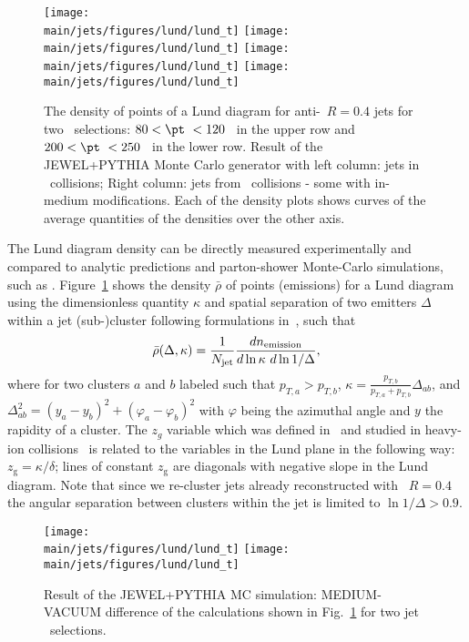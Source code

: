 \begin{figure}[htbp]
	\centering
	\texttt{[image: \\main/jets/figures/lund/lund\_t]}
	\texttt{[image: \\main/jets/figures/lund/lund\_t]}
	\texttt{[image: \\main/jets/figures/lund/lund\_t]}
	\texttt{[image: \\main/jets/figures/lund/lund\_t]}
	\caption{The density of points of a Lund diagram for anti-\kT\ $R=0.4$ jets for two \pt\ selections: $80 < \pt\ < 120$ \gevc\ in the upper row and $200 < \pt\ < 250$ \gevc\ in the lower row. Result of the JEWEL+PYTHIA Monte Carlo generator with left column: jets in \pp\ collisions; Right column: jets from \PbPb\ collisions - some with in-medium modifications. Each of the density plots shows curves of the average quantities of the densities over the other axis.}
	\label{fig:Lund_jets}
\end{figure}

The Lund diagram density can be directly measured experimentally and compared to analytic predictions and parton-shower Monte-Carlo simulations, such as \jewel.
Figure~\ref{fig:Lund_jets} shows the density $\bar{\rho}$ of points (emissions) for a Lund diagram using the dimensionless quantity $\kappa$ and spatial separation of two emitters $\Delta$ within a jet (sub-)cluster following formulations in~\cite{Dreyer:2018nbf}, such that
\begin{equation}
\bar{\rho}(\Delta, \kappa) = \frac{1}{N_{\rm jet}} \frac{dn_{\rm emission}}{d \ln \kappa~d \ln 1/\Delta},
\end{equation}
where for two clusters $a$ and $b$ labeled such that $p_{T,a} > p_{T,b}$, $\kappa=\frac{p_{T,b}}{p_{T,a} + p_{T,b}}\Delta_{ab}$, and $\Delta_{ab}^{2} = (y_a - y_b)^2 + (\varphi_a - \varphi_b)^2$ with $\varphi$ being the azimuthal angle and $y$ the rapidity of a cluster.
The $z_{g}$ variable which was defined in~\cite{Larkoski:2015lea} and studied in heavy-ion collisions~\cite{Sirunyan:2017bsd} is related to the variables in the Lund plane in the following way: $z_{\mathrm{g}} = \kappa/\delta$; lines of constant $z_\mathrm{g}$ are diagonals with negative slope in the Lund diagram. Note that since we re-cluster jets already reconstructed with \akt\ $R=0.4$ the angular separation between clusters within the jet is limited to $\ln 1/\Delta > 0.9$.

\begin{figure}[htbp]
	\centering
	\texttt{[image: \\main/jets/figures/lund/lund\_t]}
	\texttt{[image: \\main/jets/figures/lund/lund\_t]}
	\caption{Result of the JEWEL+PYTHIA MC simulation: MEDIUM-VACUUM difference of the calculations shown in Fig.~\ref{fig:Lund_jets} for two jet \pt\ selections.}
	\label{fig:Lund_jets_vac_med}
\end{figure}

